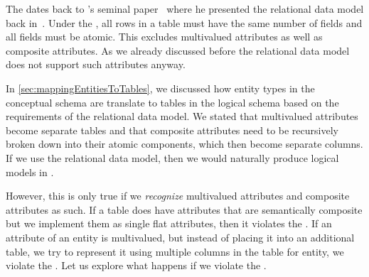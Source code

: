 %
\label{sec:normalForm:1}%
%
The  dates back to \citeauthor{C1970ARMODFLSDB}'s seminal paper~\cite{C1970ARMODFLSDB} where he presented the relational data model back in~\citeyear{C1970ARMODFLSDB}.
Under the , all rows in a table must have the same number of fields and all fields must be atomic.
This excludes multivalued attributes as well as composite attributes.
As we already discussed before the relational data model does not support such attributes anyway.

In \cref{sec:mappingEntitiesToTables}, we discussed how entity types in the conceptual schema are translate to tables in the logical schema based on the requirements of the relational data model.
We stated that multivalued attributes become separate tables and that composite attributes need to be recursively broken down into their atomic components, which then become separate columns.
If we use the relational data model, then we would naturally produce logical models in .

However, this is only true if we \emph{recognize} multivalued attributes and composite attributes as such.
If a table does have attributes that are semantically composite but we implement them as single flat attributes, then it violates the .
If an attribute of an entity is multivalued, but instead of placing it into an additional table, we try to represent it using multiple columns in the table for entity, we violate the .
Let us explore what happens if we violate the .%
%
\FloatBarrier%
%
%
\FloatBarrier%
\endhsection%
%
